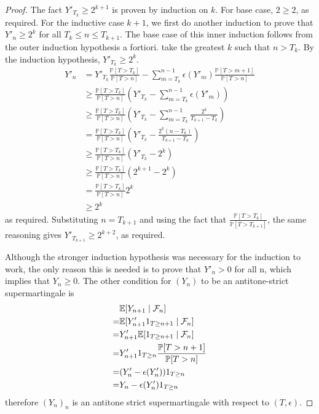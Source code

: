 \begin{proof}
The fact $Y'_{T_k} \geq 2^{k+1}$ is proven by induction on $k$. For base case, $2 \geq 2$, as required. For the inductive case $k+1$, we first do another induction to prove that $Y'_n \geq 2^k$ for all $T_k \leq n \leq T_{k+1}$. The base case of this inner induction follows from the outer induction hypothesis a fortiori. take the greatest $k$ such that $n > T_k$. By the induction hypothesis, $Y'_{T_k} \geq 2^k$.
\begin{align*}
    Y'_n & = Y'_{T_k} \frac{\mathbb P[T > T_k]}{\mathbb P[T > n]} - \sum_{m=T_k}^{n-1} \epsilon(Y'_m) \frac{\mathbb P[T > m+1]}{\mathbb P[T > n]} \\
    & \geq \frac{\mathbb P[T > T_k]}{\mathbb P[T > n]} (Y'_{T_k} - \sum_{m=T_k}^{n-1} \epsilon(Y'_m)) \\
    & \geq \frac{\mathbb P[T > T_k]}{\mathbb P[T > n]} (Y'_{T_k} - \sum_{m=T_k}^{n-1} \frac{2^k}{T_{k+1}-T_k}) \\
    & = \frac{\mathbb P[T > T_k]}{\mathbb P[T > n]} (Y'_{T_k} - \frac{2^k (n - T_k)}{T_{k+1}-T_k}) \\
    & \geq \frac{\mathbb P[T > T_k]}{\mathbb P[T > n]} (Y'_{T_k} - 2^k) \\
    & \geq \frac{\mathbb P[T > T_k]}{\mathbb P[T > n]} (2^{k+1} - 2^k) \\
    & = \frac{\mathbb P[T > T_k]}{\mathbb P[T > n]} 2^k \\
    & \geq 2^k
\end{align*}
as required. Substituting $n = T_{k+1}$ and using the fact that $\frac{\mathbb P[T > T_k]}{\mathbb P[T > T_{k+1}]}$, the same reasoning gives $Y'_{T_{k+1}} \geq 2^{k+2}$, as required.

Although the stronger induction hypothesis was necessary for the induction to work, the only reason this is needed is to prove that $Y'_n > 0$ for all n, which implies that $Y_n \geq 0$. The other condition for $(Y_n)$ to be an antitone-strict supermartingale is  \\
\begin{align*}
    & \mathbb{E}[Y_{n+1} \mid \mathcal F_n] \\
    = & \mathbb{E}[Y'_{n+1} 1_{T \geq n+1} \mid \mathcal F_n] \\
    = & Y'_{n+1} \mathbb{E}[1_{T \geq n+1} \mid \mathcal F_n] \\ 
    = & Y'_{n+1} 1_{T \geq n} \frac{\mathbb P[T > n+1]}{\mathbb P[T > n]} \\
    = & (Y'_n - \epsilon(Y'_n)) 1_{T \geq n} \\
    = & Y_n - \epsilon(Y'_n) 1_{T \geq n}
\end{align*}
therefore $(Y_n)_n$ is an antitone strict supermartingale with respect to $(T,\epsilon)$.
\end{proof}


